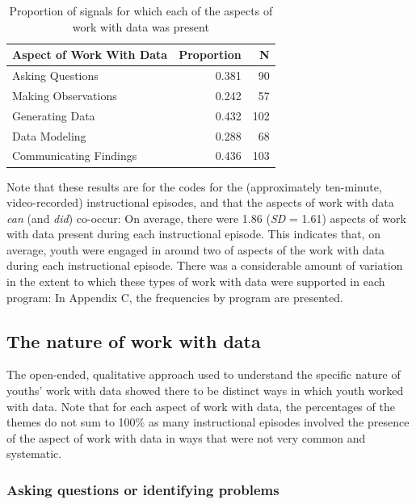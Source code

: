 \documentclass[]{msu-thesis}
\theoremstyle{definition}
\theoremstyle{definition}
\theoremstyle{definition}
\theoremstyle{remark}
\begin{document}
\begin{table}

\caption{\label{tab:unnamed-chunk-9}Proportion of signals for which each of the aspects of work with data was present}
\centering
\begin{tabular}[t]{lrr}
\toprule
Aspect of Work With Data & Proportion & N\\
\midrule
Asking Questions & 0.381 & 90\\
Making Observations & 0.242 & 57\\
Generating Data & 0.432 & 102\\
Data Modeling & 0.288 & 68\\
Communicating Findings & 0.436 & 103\\
\bottomrule
\end{tabular}
\end{table}

Note that these results are for the codes for the (approximately
ten-minute, video-recorded) instructional episodes, and that the aspects
of work with data \emph{can} (and \emph{did}) co-occur: On average,
there were 1.86 (\emph{SD} = 1.61) aspects of work with data present
during each instructional episode. This indicates that, on average,
youth were engaged in around two of aspects of the work with data during
each instructional episode. There was a considerable amount of variation
in the extent to which these types of work with data were supported in
each program: In Appendix C, the frequencies by program are presented.

\subsection{The nature of work with
data}\label{the-nature-of-work-with-data}

The open-ended, qualitative approach used to understand the specific
nature of youths' work with data showed there to be distinct ways in
which youth worked with data. Note that for each aspect of work with
data, the percentages of the themes do not sum to 100\% as many
instructional episodes involved the presence of the aspect of work with
data in ways that were not very common and systematic.

\subsubsection{Asking questions or identifying
problems}\label{asking-questions-or-identifying-problems}
\end{document}
